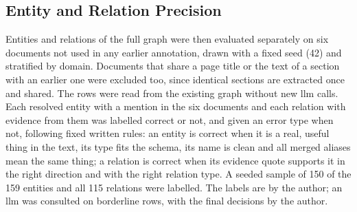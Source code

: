 \subsection{Entity and Relation Precision}\label{sec:kg:precision}

Entities and relations of the full graph were then evaluated separately on six documents
not used in any earlier annotation, drawn with a fixed seed (42) and stratified by
domain. Documents that share a page title or the text of a section with an earlier one
were excluded too, since identical sections are extracted once and shared. The rows were
read from the existing graph without new \gls{llm} calls. Each resolved entity with a
mention in the six documents and each relation with evidence from them was labelled
correct or not, and given an error type when not, following fixed written rules: an
entity is correct when it is a real, useful thing in the text, its type fits the schema,
its name is clean and all merged aliases mean the same thing; a relation is correct when
its evidence quote supports it in the right direction and with the right relation type.
A seeded sample of 150 of the 159 entities and all 115 relations were labelled. The
labels are by the author; an \gls{llm} was consulted on borderline rows, with the final
decisions by the author.

